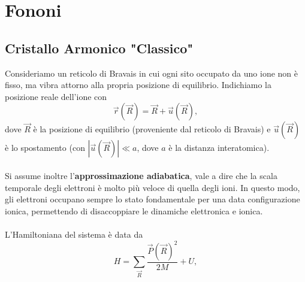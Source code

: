 

\chapter{Fononi}
\section{Cristallo Armonico "Classico"}
Consideriamo un reticolo di Bravais in cui ogni sito occupato da uno ione non è fisso, ma vibra attorno alla propria posizione di equilibrio. Indichiamo la posizione reale dell'ione con
\[
\vec{r}(\vec{R}) = \vec{R} + \vec{u}(\vec{R}),
\]
dove \(\vec{R}\) è la posizione di equilibrio (proveniente dal reticolo di Bravais) e \(\vec{u}(\vec{R})\) è lo spostamento (con \(|\vec{u}(\vec{R})| \ll a\), dove \(a\) è la distanza interatomica).\\\\
Si assume inoltre l'\textbf{approssimazione adiabatica}, vale a dire che la scala temporale degli elettroni è molto più veloce di quella degli ioni. In questo modo, gli elettroni occupano sempre lo stato fondamentale per una data configurazione ionica, permettendo di disaccoppiare le dinamiche elettronica e ionica.\\\\
L'Hamiltoniana del sistema è data da
\[
H = \sum_{\vec{R}} \frac{\vec{P}(\vec{R})^2}{2M} + U,
\]

